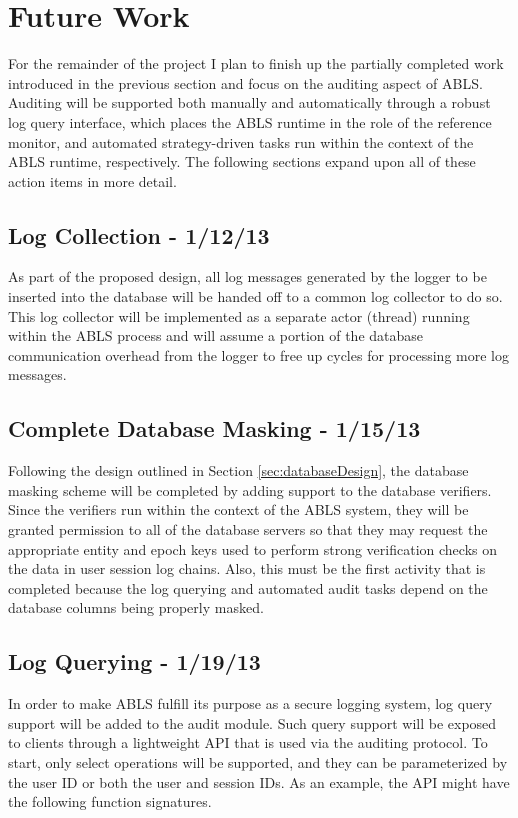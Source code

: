 \documentclass{sig-alternate}
\begin{document}
\section{Future Work}
For the remainder of the project I plan to finish up the partially completed work introduced in the previous section and 
focus on the auditing aspect of ABLS. Auditing will be supported both manually and automatically through
a robust log query interface, which places the ABLS runtime in the role of the reference monitor, and automated
strategy-driven tasks run within the context of the ABLS runtime, respectively. The following sections expand upon all
of these action items in more detail.

\subsection{Log Collection - 1/12/13}
As part of the proposed design, all log messages generated by the logger to be inserted into the 
database will be handed off to a common log collector to do so. This log collector will be implemented as a 
separate actor (thread) running within the ABLS process and will assume a portion of the database 
communication overhead from the logger to free up cycles for processing more log messages. 

\subsection{Complete Database Masking - 1/15/13}
Following the design outlined in Section \ref{sec:databaseDesign}, the database masking scheme will be completed by
adding support to the database verifiers. Since the verifiers run within the context of the ABLS system, they will be granted
permission to all of the database servers so that they may request the appropriate entity and epoch keys used to perform
strong verification checks on the data in user session log chains. Also, this must be the first activity that is completed 
because the log querying and automated audit tasks depend on the database columns being properly masked. 

\subsection{Log Querying - 1/19/13}
In order to make ABLS fulfill its purpose as a secure logging system, log query support will be added to the audit
module. Such query support will be exposed to clients through a lightweight API that is used via the auditing protocol.
To start, only select operations will be supported, and they can be parameterized by the user ID or both the user and 
session IDs. As an example, the API might have the following function signatures. \\
\end{document}
